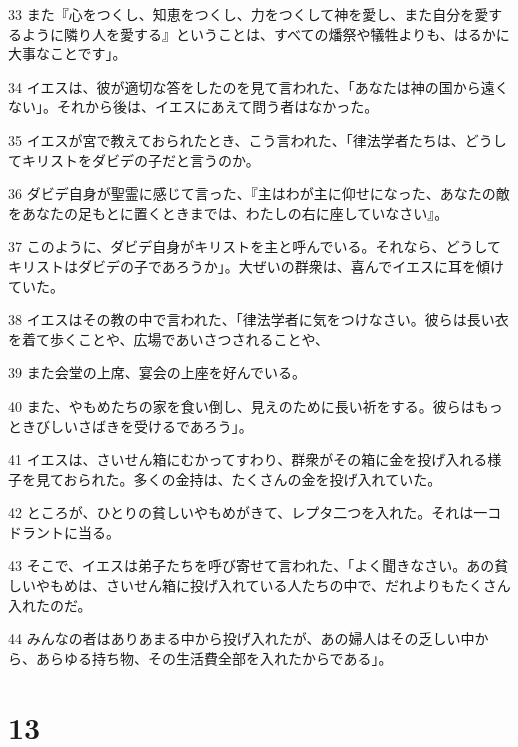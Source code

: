 \par 33 また『心をつくし、知恵をつくし、力をつくして神を愛し、また自分を愛するように隣り人を愛する』ということは、すべての燔祭や犠牲よりも、はるかに大事なことです」。
\par 34 イエスは、彼が適切な答をしたのを見て言われた、「あなたは神の国から遠くない」。それから後は、イエスにあえて問う者はなかった。
\par 35 イエスが宮で教えておられたとき、こう言われた、「律法学者たちは、どうしてキリストをダビデの子だと言うのか。
\par 36 ダビデ自身が聖霊に感じて言った、『主はわが主に仰せになった、あなたの敵をあなたの足もとに置くときまでは、わたしの右に座していなさい』。
\par 37 このように、ダビデ自身がキリストを主と呼んでいる。それなら、どうしてキリストはダビデの子であろうか」。大ぜいの群衆は、喜んでイエスに耳を傾けていた。
\par 38 イエスはその教の中で言われた、「律法学者に気をつけなさい。彼らは長い衣を着て歩くことや、広場であいさつされることや、
\par 39 また会堂の上席、宴会の上座を好んでいる。
\par 40 また、やもめたちの家を食い倒し、見えのために長い祈をする。彼らはもっときびしいさばきを受けるであろう」。
\par 41 イエスは、さいせん箱にむかってすわり、群衆がその箱に金を投げ入れる様子を見ておられた。多くの金持は、たくさんの金を投げ入れていた。
\par 42 ところが、ひとりの貧しいやもめがきて、レプタ二つを入れた。それは一コドラントに当る。
\par 43 そこで、イエスは弟子たちを呼び寄せて言われた、「よく聞きなさい。あの貧しいやもめは、さいせん箱に投げ入れている人たちの中で、だれよりもたくさん入れたのだ。
\par 44 みんなの者はありあまる中から投げ入れたが、あの婦人はその乏しい中から、あらゆる持ち物、その生活費全部を入れたからである」。

\chapter{13}


